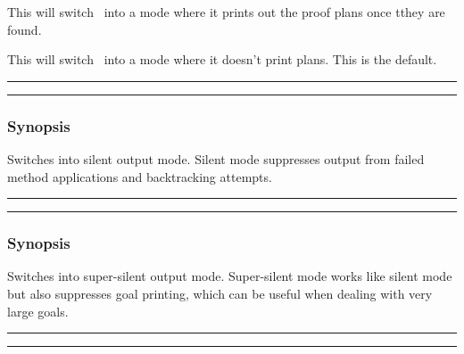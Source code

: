 \noindent This will switch \lclam\ into a mode where it prints out the 
proof plans once tthey are found.


\noindent This will switch \lclam\ into a mode where it doesn't print plans.  This is the default. \\

\vspace{2mm} \hrule \vspace{2mm}
\begin{Large}
\end{Large}
\vspace{2mm}
\hrule
\vspace{2mm}


\subsubsection*{Synopsis}
Switches \lclam into silent output mode.  Silent mode
suppresses output from failed method applications and backtracking
attempts.


\vspace{2mm} \hrule \vspace{2mm}
\begin{Large}
\end{Large}
\vspace{2mm}
\hrule
\vspace{2mm}


\subsubsection*{Synopsis}
Switches \lclam into super-silent output mode.  Super-silent mode
works like silent mode but also suppresses goal printing, which can be
useful when dealing with very large goals.

\vspace{2mm} \hrule \vspace{2mm}
\begin{Large}
\end{Large}
\vspace{2mm}
\hrule
\vspace{2mm}

